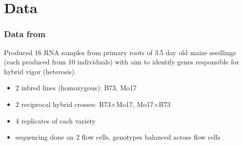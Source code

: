 \documentclass{beamer}
\begin{document}
\section{Data}
\begin{frame}%
  \frametitle{Data from \citet{paschold}}
  Produced 16 RNA samples from primary roots of 3.5 day old maize seedlings (each produced from 10 individuals) with aim to identify genes responsible for hybrid vigor (heterosis).
  \vspace{.5cm}
  \pause\begin{beamerboxesrounded}[upper=upcol,lower=lowcol,shadow=true]{}
  \begin{itemize}
    \item 2 inbred lines (homozygous): B73, Mo17
    \item 2 reciprocal hybrid crosses: B73$\times$Mo17, Mo17$\times$B73
    \item 4 replicates of each variety
    \item sequencing done on 2 flow cells, genotypes balanced across flow cells
  \end{itemize}
  \end{beamerboxesrounded}
\end{frame}
\end{document}
